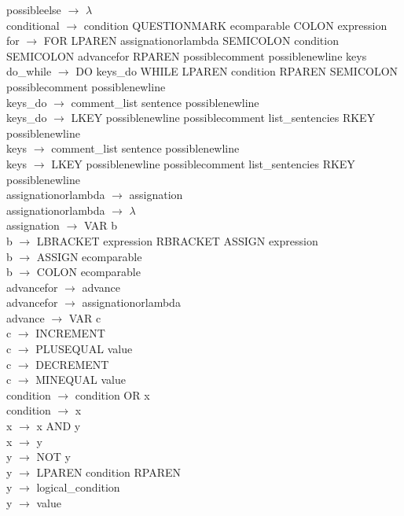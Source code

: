 \documentclass[10pt,a4paper]{article}
\begin{document}
possibleelse $\rightarrow$ $\lambda$ \\
conditional $\rightarrow$ condition QUESTIONMARK ecomparable COLON expression \\
for $\rightarrow$ FOR LPAREN assignationorlambda SEMICOLON condition SEMICOLON advancefor RPAREN possiblecomment possiblenewline keys \\
do\_while $\rightarrow$ DO keys\_do WHILE LPAREN condition RPAREN SEMICOLON possiblecomment possiblenewline \\
keys\_do $\rightarrow$ comment\_list sentence possiblenewline \\
keys\_do $\rightarrow$ LKEY possiblenewline possiblecomment list\_sentencies RKEY possiblenewline \\
keys $\rightarrow$ comment\_list sentence possiblenewline \\
keys $\rightarrow$ LKEY possiblenewline possiblecomment list\_sentencies RKEY possiblenewline \\
assignationorlambda $\rightarrow$ assignation \\
assignationorlambda $\rightarrow$ $\lambda$ \\
assignation $\rightarrow$ VAR b \\
b $\rightarrow$ LBRACKET expression RBRACKET ASSIGN expression \\
b $\rightarrow$ ASSIGN ecomparable \\
b $\rightarrow$ COLON ecomparable \\
advancefor $\rightarrow$ advance \\
advancefor $\rightarrow$ assignationorlambda \\
advance $\rightarrow$ VAR c \\
c $\rightarrow$ INCREMENT \\
c $\rightarrow$ PLUSEQUAL value \\
c $\rightarrow$ DECREMENT \\
c $\rightarrow$ MINEQUAL value \\
condition $\rightarrow$ condition OR x \\
condition $\rightarrow$ x \\
x $\rightarrow$ x AND y \\
x $\rightarrow$ y \\
y $\rightarrow$ NOT y \\
y $\rightarrow$ LPAREN condition RPAREN \\
y $\rightarrow$ logical\_condition \\
y $\rightarrow$ value \\
\end{document}

